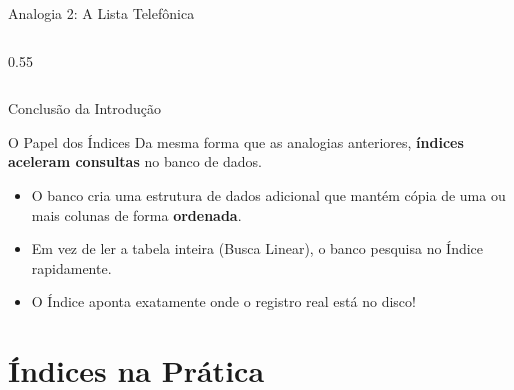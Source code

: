 \documentclass[9pt]{beamer}
\begin{document}
\begin{frame}{Analogia 2: A Lista Telefônica}
\begin{columns}
\begin{column}{0.55\textwidth}
\begin{center}
            \end{center}
        \end{column}
    \end{columns}
\end{frame}

\begin{frame}{Conclusão da Introdução}
    \begin{block}{O Papel dos Índices}
        Da mesma forma que as analogias anteriores, \textbf{índices aceleram consultas} no banco de dados.
    \end{block}
    
    \vspace{0.5cm}
    \begin{itemize}
        \item O banco cria uma estrutura de dados adicional que mantém cópia de uma ou mais colunas de forma \textbf{ordenada}.
        \item Em vez de ler a tabela inteira (Busca Linear), o banco pesquisa no Índice rapidamente.
        \item O Índice aponta exatamente onde o registro real está no disco!
    \end{itemize}
\end{frame}
\section{Índices na Prática}
\end{document}
